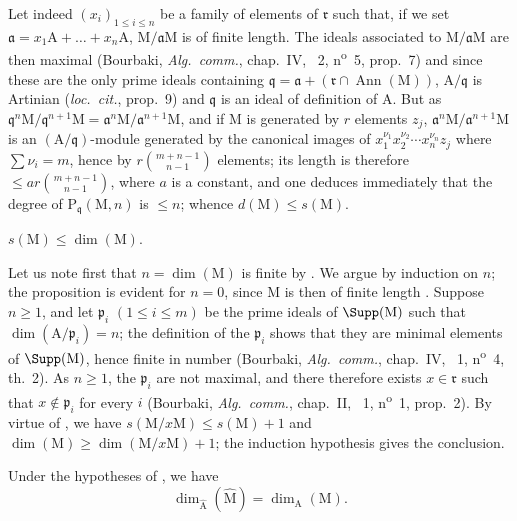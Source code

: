 Let indeed $(x_i)_{1\leq i\leq n}$ be a family of elements of $\mathfrak{r}$ such that, if we set $\mathfrak{a}=x_1\mathrm{A}+\ldots+x_n\mathrm{A}$, $\mathrm{M}/\mathfrak{a}\mathrm{M}$ is of finite length.
The ideals associated to $\mathrm{M}/\mathfrak{a}\mathrm{M}$ are then maximal (Bourbaki, \emph{Alg.~comm.}, chap.~IV, \textsection~2, n\textsuperscript{o}~5, prop.~7) and since these are the only prime ideals containing $\mathfrak{q}=\mathfrak{a}+(\mathfrak{r}\cap\operatorname{Ann}(\mathrm{M}))$, $\mathrm{A}/\mathfrak{q}$ is Artinian (\emph{loc.~cit.}, prop.~9) and $\mathfrak{q}$ is an ideal of definition of $\mathrm{A}$.
But as $\mathfrak{q}^n\mathrm{M}/\mathfrak{q}^{n+1}\mathrm{M}=\mathfrak{a}^n\mathrm{M}/\mathfrak{a}^{n+1}\mathrm{M}$, and if $\mathrm{M}$ is generated by $r$ elements $z_j$, $\mathfrak{a}^n\mathrm{M}/\mathfrak{a}^{n+1}\mathrm{M}$ is an $(\mathrm{A}/\mathfrak{q})$-module generated by the canonical images of $x_1^{\nu_1}x_2^{\nu_2}\cdots x_n^{\nu_n}z_j$ where $\sum\nu_i=m$, hence by $r\binom{m+n-1}{n-1}$ elements; its length is therefore $\leq ar\binom{m+n-1}{n-1}$, where $a$ is a constant, and one deduces immediately that the degree of $\mathrm{P}_\mathfrak{q}(\mathrm{M},n)$ is $\leq n$; whence $d(\mathrm{M})\leq s(\mathrm{M})$.

\begin{env}[16.2.3.4]
\label{0.16.2.3.4}
$s(\mathrm{M})\leq\dim(\mathrm{M})$.
\end{env}

Let us note first that $n=\dim(\mathrm{M})$ is finite by .
We argue by induction on $n$; the proposition is evident for $n=0$, since $\mathrm{M}$ is then of finite length .
Suppose $n\geq 1$, and let $\mathfrak{p}_i$ $(1\leq i\leq m)$ be the prime ideals of $\Supp(\mathrm{M})$ such that $\dim(\mathrm{A}/\mathfrak{p}_i)=n$; the definition of the $\mathfrak{p}_i$ shows that they are minimal elements of $\Supp(\mathrm{M})$, hence finite in number (Bourbaki, \emph{Alg.~comm.}, chap.~IV, \textsection~1, n\textsuperscript{o}~4, th.~2).
As $n\geq 1$, the $\mathfrak{p}_i$ are not maximal, and there therefore exists $x\in\mathfrak{r}$ such that $x\notin\mathfrak{p}_i$ for every $i$ (Bourbaki, \emph{Alg.~comm.}, chap.~II, \textsection~1, n\textsuperscript{o}~1, prop.~2).
By virtue of , we have $s(\mathrm{M}/x\mathrm{M})\leq s(\mathrm{M})+1$ and $\dim(\mathrm{M})\geq\dim(\mathrm{M}/x\mathrm{M})+1$; the induction hypothesis gives the conclusion.

\begin{corollary}[16.2.4]
\label{0.16.2.4}
Under the hypotheses of , we have
\begin{equation}
\label{0.16.2.4.1}
\tag{16.2.4.1}
  \dim_{\widehat{\mathrm{A}}}(\widehat{\mathrm{M}})=\dim_\mathrm{A}(\mathrm{M}).
\end{equation}
\end{corollary}

